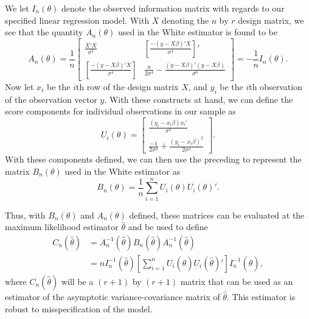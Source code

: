 \documentclass[12pt]{article} %
\theoremstyle{definition}
\begin{document}
		We let $I_{n} (\theta)$ denote the observed information matrix with regards to our specified linear regression model. With $X$ denoting the $n$ by $r$ design matrix, we see that
		the quantity $A_n (\theta)$ used in the White estimator is found to be 
		\begin{equation*}
			A_n(\theta) = \frac{1}{n}
			\begin{bmatrix}
				\frac{X'X}{\sigma^2} & \left[ \frac{-(y-X\beta)'X}{\sigma^4} \right]' \\
				\left[ \frac{-(y-X\beta)'X}{\sigma^4} \right] &  \frac{n}{2 \sigma^4} - \frac{(y-X\beta)'(y-X\beta)}{\sigma^6}
				\end{bmatrix}
				= -\frac{1}{n} I_n(\theta) .
		\end{equation*}
		Now let $x_i$ be the $i$th row of the design matrix $X$, and $y_i$ be the $i$th observation of the observation vector $y$. With these constructs at hand, we can define the score components
		for individual observations in our sample as
		\begin{equation*}
			U_i(\theta) = 
			\begin{bmatrix}
				\frac{(y_i-x_i \beta)x_i'}{\sigma^2} \\
				\frac{-1}{2 \sigma^2} + \frac{(y_i - x_i \beta)^2}{2 \sigma^4}
			\end{bmatrix}
			.
		\end{equation*}
		With these components defined, we can then use the preceding to represent the matrix $B_n (\theta)$ used in the White estimator as
		\begin{equation*}
			B_n(\theta) = \frac{1}{n} \sum_{i=1}^{n} U_i(\theta) U_i(\theta)' .
		\end{equation*}

		Thus, with $B_n(\theta)$ and $A_n(\theta)$ defined, these matrices can be evaluated at the maximum likelihood estimator $\hat{\theta}$ and be used to define
		\begin{equation*}
			\begin{split}
				C_n(\hat{\theta}) & = A^{-1}_n(\hat{\theta}) B_n(\hat{\theta}) A^{-1}_n(\hat{\theta}) \\
				& = n I_n^{-1}(\hat{\theta}) \left[ \sum_{i=1}^{n} U_i(\hat{\theta}) U_i(\hat{\theta})' \right] I_n^{-1}(\hat{\theta}) ,
			\end{split}
		\end{equation*}
		where $C_n(\hat{\theta})$ will be a $(r+1)$ by $(r+1)$ matrix that can be used as an estimator of the asymptotic variance-covariance matrix of $\hat{\theta}$. This estimator is robust to misspecification
		of the model.
		
\end{document}

